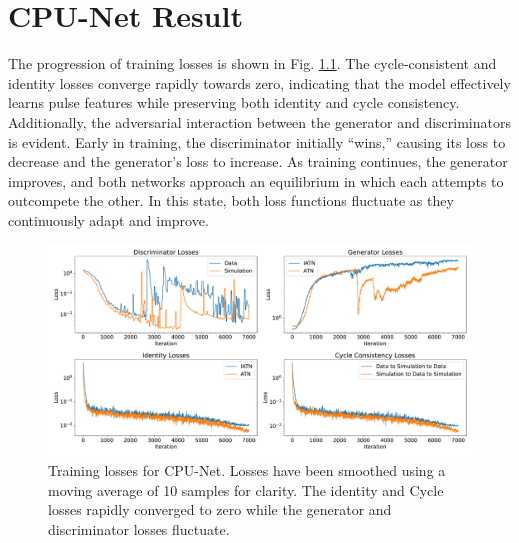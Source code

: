 \chapter{CPU-Net Result}




The progression of training losses is shown in Fig. \ref{fig:training_loss}. The cycle-consistent and identity losses converge rapidly towards zero, indicating that the model effectively learns pulse features while preserving both identity and cycle consistency. Additionally, the adversarial interaction between the generator and discriminators is evident. Early in training, the discriminator initially “wins,” causing its loss to decrease and the generator’s loss to increase. As training continues, the generator improves, and both networks approach an equilibrium in which each attempts to outcompete the other. In this state, both loss functions fluctuate as they continuously adapt and improve.


\begin{figure}%
    \includegraphics[width=0.99\linewidth]{ch8/figs/loss_funcs.pdf}
    \caption{Training losses for CPU-Net. Losses have been smoothed using a moving average of 10 samples for clarity. The identity and Cycle losses rapidly converged to zero while the generator and discriminator losses fluctuate.} 
   \label{fig:training_loss}
\end{figure}


